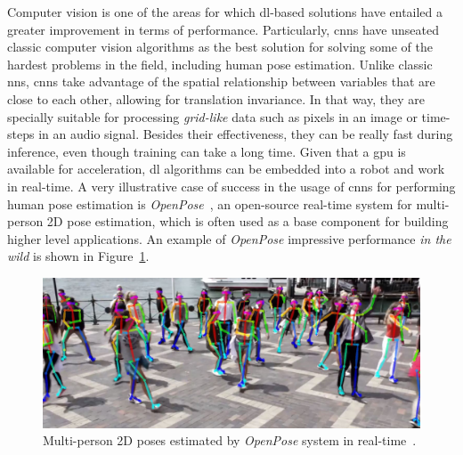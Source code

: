 Computer vision is one of the areas for which \gls{dl}-based solutions have entailed a greater improvement in terms of performance. Particularly, \glspl{cnn} have unseated classic computer vision algorithms as the best solution for solving some of the hardest problems in the field, including human pose estimation. Unlike classic \glspl{nn}, \glspl{cnn} take advantage of the spatial relationship between variables that are close to each other, allowing for translation invariance. In that way, they are specially suitable for processing \emph{grid-like} data such as pixels in an image or time-steps in an audio signal. Besides their effectiveness, they can be really fast during inference, even though training can take a long time. Given that a \gls{gpu} is available for acceleration, \gls{dl} algorithms can be embedded into a robot and work in real-time. A very illustrative case of success in the usage of \glspl{cnn} for performing human pose estimation is \emph{OpenPose}~\cite{cao2018openpose}, an open-source real-time system for multi-person 2D pose estimation, which is often used as a base component for building higher level applications. An example of \emph{OpenPose} impressive performance \textit{in the wild} is shown in Figure~\ref{fig:openpose}.

\begin{figure}[h]
    \centering
    \includegraphics[width=\textwidth]{figures/openpose.JPG}
    \caption{Multi-person 2D poses estimated by \emph{OpenPose} system in real-time~\cite{cao2018openpose}.}
    \label{fig:openpose}
\end{figure}

